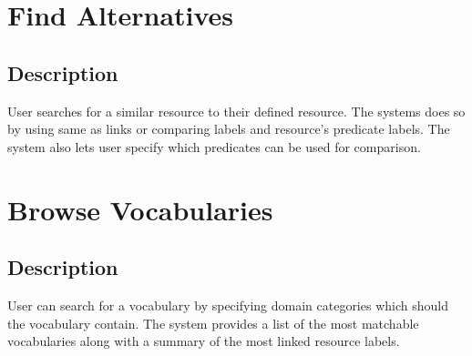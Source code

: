 \section{Find Alternatives} 
\subsection{Description}
User searches for a similar resource to their defined resource. The systems does so by using same as links or comparing labels and resource's predicate labels. The system also lets user specify which predicates can be used for comparison.

\section{Browse Vocabularies}
\subsection{Description}
User can search for a vocabulary by specifying domain categories which should the vocabulary contain. The system provides a list of the most matchable vocabularies along with a summary of the most linked resource labels.



